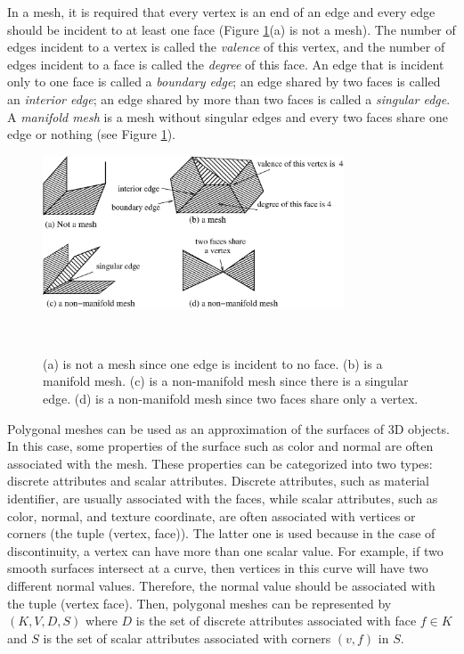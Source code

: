     In a mesh, it is required that every
    vertex is an end of an edge and every edge should be incident to at
    least one face (Figure \ref{mesh_non_mesh}(a) is not a mesh).
    The number of edges incident to a vertex is called the
    \emph{valence} of this vertex, and the number of edges incident to
    a face is called the \emph{degree} of this face. An edge that is 
    incident only to one face is called a \emph{boundary edge}; an edge
    shared by two faces is called an \emph{interior edge}; an edge
    shared by more than two faces is called a \emph{singular edge}. A
    \emph{manifold mesh} is a mesh without singular edges and every
    two faces share one edge or nothing (see Figure \ref{mesh_non_mesh}).
\begin{figure}
\centering
\includegraphics[width=0.8\textwidth]{figure2.1.eps}
\caption[Manifold mesh, non-manifold mesh and non-mesh]{ (a) is not
a mesh since one edge is incident to no face. (b) is a manifold
mesh. (c) is a non-manifold mesh since there is a singular edge.
(d) is a non-manifold mesh since two faces share only a
vertex.\label{mesh_non_mesh}}\
\end{figure}

    Polygonal meshes can be used as an approximation of the surfaces
    of 3D objects. In this case, some properties of the surface such
    as color and normal are often associated with the mesh. These
    properties can be categorized into two types: discrete attributes
    and scalar attributes\label{property}. Discrete attributes, such
    as material identifier, are usually associated with the faces, while
    scalar attributes, such as color, normal, and texture coordinate,
    are often associated with vertices or corners (the tuple (vertex,
    face)). The latter one is used because in the case of
    discontinuity, a vertex can have more than one scalar value. For
    example, if two smooth surfaces intersect at a curve, then vertices
    in this curve will have two different normal values. Therefore,
    the normal value should be associated with the tuple (vertex face).
    Then, polygonal meshes can be represented by $(K, V, D, S)$ where
    $D$ is the set of discrete attributes associated with face $f \in
    K$ and $S$ is the set of scalar attributes associated with corners $(v, f)$ in $S$.

